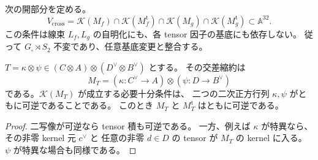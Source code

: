 \begin{definition}[四つの交差縮約条件]
\label{def:qa-square-cross-geometric-open}
次の開部分を定める。
\[
 V_{\mathrm{cross}}=
 \mathcal K(M_f)\cap\mathcal K(M_f^{\mathrm t})
 \cap\mathcal K(M_g)\cap\mathcal K(M_g^{\mathrm t})
 \subset\mathbb A^{32}.
 \tag{CG}\label{eq:qa-square-four-cross-open}
\]
この条件は線束 $L_f,L_g$ の自明化にも、各 tensor 因子の基底にも依存しない。
従って $G_\square\rtimes S_2$ 不変であり、任意基底変更と整合する。
\end{definition}

\begin{lemma}[階数一テンソルの交差縮約]
\label{lem:qa-rank-one-cross-kronecker}
$T=\kappa\otimes\psi\in(C\otimes A)\otimes(D^\vee\otimes B^\vee)$ とする。
その交差縮約は
\[
 M_T=(\kappa:C^\vee\to A)\otimes(\psi:D\to B^\vee)
\]
である。$\mathcal K(M_T)$ が成立する必要十分条件は、
二つの二次正方行列 $\kappa,\psi$ がともに可逆であることである。
このとき $M_T$ と $M_T^{\mathrm t}$ はともに可逆である。
\end{lemma}
\begin{proof}
二写像が可逆なら tensor 積も可逆である。
一方、例えば $\kappa$ が特異なら、その非零 kernel 元 $c^\vee$ と
任意の非零 $d\in D$ の tensor が $M_T$ の kernel に入る。
$\psi$ が特異な場合も同様である。
\end{proof}

